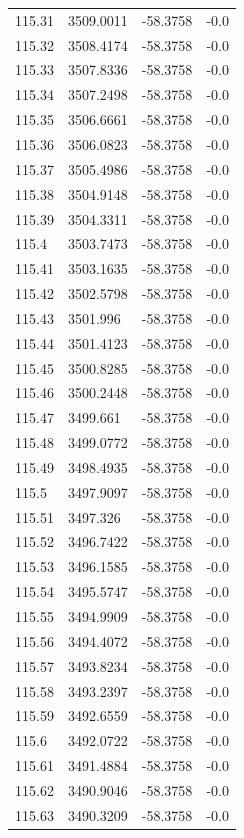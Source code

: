 \begin{table}[H]
\begin{tabular}{llll}
115.31 & 3509.0011 & -58.3758 & -0.0 \\
115.32 & 3508.4174 & -58.3758 & -0.0 \\
115.33 & 3507.8336 & -58.3758 & -0.0 \\
115.34 & 3507.2498 & -58.3758 & -0.0 \\
115.35 & 3506.6661 & -58.3758 & -0.0 \\
115.36 & 3506.0823 & -58.3758 & -0.0 \\
115.37 & 3505.4986 & -58.3758 & -0.0 \\
115.38 & 3504.9148 & -58.3758 & -0.0 \\
115.39 & 3504.3311 & -58.3758 & -0.0 \\
115.4 & 3503.7473 & -58.3758 & -0.0 \\
115.41 & 3503.1635 & -58.3758 & -0.0 \\
115.42 & 3502.5798 & -58.3758 & -0.0 \\
115.43 & 3501.996 & -58.3758 & -0.0 \\
115.44 & 3501.4123 & -58.3758 & -0.0 \\
115.45 & 3500.8285 & -58.3758 & -0.0 \\
115.46 & 3500.2448 & -58.3758 & -0.0 \\
115.47 & 3499.661 & -58.3758 & -0.0 \\
115.48 & 3499.0772 & -58.3758 & -0.0 \\
115.49 & 3498.4935 & -58.3758 & -0.0 \\
115.5 & 3497.9097 & -58.3758 & -0.0 \\
115.51 & 3497.326 & -58.3758 & -0.0 \\
115.52 & 3496.7422 & -58.3758 & -0.0 \\
115.53 & 3496.1585 & -58.3758 & -0.0 \\
115.54 & 3495.5747 & -58.3758 & -0.0 \\
115.55 & 3494.9909 & -58.3758 & -0.0 \\
115.56 & 3494.4072 & -58.3758 & -0.0 \\
115.57 & 3493.8234 & -58.3758 & -0.0 \\
115.58 & 3493.2397 & -58.3758 & -0.0 \\
115.59 & 3492.6559 & -58.3758 & -0.0 \\
115.6 & 3492.0722 & -58.3758 & -0.0 \\
115.61 & 3491.4884 & -58.3758 & -0.0 \\
115.62 & 3490.9046 & -58.3758 & -0.0 \\
115.63 & 3490.3209 & -58.3758 & -0.0 \\

\end{tabular}
\end{table}
